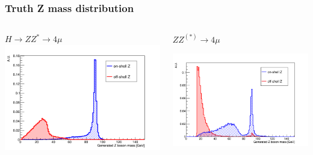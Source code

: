 \documentclass{beamer}
\begin{document}

\begin{frame}
\frametitle{Truth Z mass distribution}

\begin{columns}
\begin{column}{.5\textwidth}
\centering
$H \rightarrow ZZ^* \rightarrow 4\mu$
\includegraphics[width=\textwidth]{HZZ4mu/genZMass}
\end{column}
\begin{column}{.5\textwidth}
\centering
$ZZ^{(*)} \rightarrow 4\mu$\par
\includegraphics[width=\textwidth]{ZZ4mu/genZMass}
\end{column}
\end{columns}
\end{frame}


\end{document}
